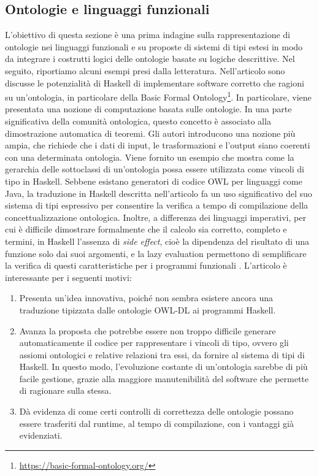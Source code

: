 \subsection{Ontologie e linguaggi funzionali}
L'obiettivo di questa sezione è una prima indagine sulla rappresentazione di ontologie nei linguaggi funzionali e su proposte di sistemi di tipi estesi in modo da integrare i costrutti logici delle ontologie basate su logiche descrittive. Nel seguito, riportiamo alcuni esempi presi dalla letteratura.
Nell'articolo \cite{verifiableontologybasedcomputation} sono discusse le potenzialità di Haskell di implementare software corretto che ragioni su un'ontologia, in particolare della Basic Formal Ontology\footnote{\url{https://basic-formal-ontology.org/}}. In particolare, viene presentata una nozione di computazione basata sulle ontologie. In una parte significativa della comunità ontologica, questo concetto è associato alla dimostrazione automatica di teoremi. Gli autori introducono una nozione più ampia, che richiede che i dati di input, le trasformazioni e l'output siano coerenti con una determinata ontologia. Viene fornito un esempio che mostra come la gerarchia delle sottoclassi di un'ontologia possa essere utilizzata come vincoli di tipo in Haskell. Sebbene esistano generatori di codice OWL per linguaggi come Java, la traduzione in Haskell descritta nell'articolo fa un uso significativo del suo sistema di tipi espressivo per consentire la verifica a tempo di compilazione della concettualizzazione ontologica. Inoltre, a differenza dei linguaggi imperativi, per cui è difficile dimostrare formalmente che il calcolo sia corretto, completo e termini, in Haskell l'assenza di \textit{side effect}, cioè la dipendenza del risultato di una funzione solo dai suoi argomenti, e la lazy evaluation permettono di semplificare la verifica di questi caratteristiche per i programmi funzionali \cite{hugheswhyFPMatters}. L'articolo è interessante per i seguenti motivi:
\begin{enumerate}
	\item Presenta un'idea innovativa, poiché non sembra esistere ancora una traduzione tipizzata dalle ontologie OWL-DL ai programmi Haskell.
	\item Avanza la proposta che potrebbe essere non troppo difficile generare automaticamente il codice per rappresentare i vincoli di tipo, ovvero gli assiomi ontologici e relative relazioni tra essi, da fornire al sistema di tipi di Haskell. In questo modo, l'evoluzione costante di un'ontologia sarebbe di più facile gestione, grazie alla maggiore manutenibilità del software che permette di ragionare sulla stessa.
	\item Dà evidenza di come certi controlli di correttezza delle ontologie possano essere trasferiti dal runtime, al tempo di compilazione, con i vantaggi già evidenziati.
\end{enumerate}

